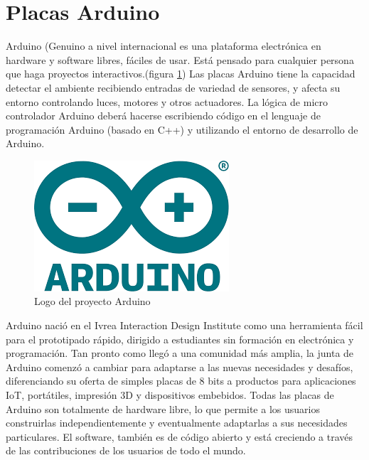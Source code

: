 \section{Placas Arduino}
Arduino (Genuino a nivel internacional es una plataforma electrónica en hardware y software libres, fáciles de usar. Está pensado para cualquier persona que haga proyectos interactivos.\cite{ArduinoOfficial}(figura \ref{fig:arduino_logo}) Las placas Arduino tiene la capacidad  detectar el ambiente recibiendo entradas de variedad de sensores, y afecta su entorno controlando luces, motores y otros actuadores. La lógica de micro controlador Arduino deberá hacerse escribiendo código en el lenguaje de programación Arduino (basado en C++) y utilizando el entorno de desarrollo de Arduino.\\

\begin{figure}[htb]
\centering
\includegraphics[scale=0.35]{./Figuras/arduino_logo.png}
\caption{Logo del proyecto Arduino}
\label{fig:arduino_logo}
\vspace*{-10pt}
\end{figure}

Arduino nació en el Ivrea Interaction Design Institute como una herramienta fácil para el prototipado rápido, dirigido a estudiantes sin formación en electrónica y programación. Tan pronto como llegó a una comunidad más amplia, la junta de Arduino comenzó a cambiar para adaptarse a las nuevas necesidades y desafíos, diferenciando su oferta de simples placas de 8 bits a productos para aplicaciones IoT, portátiles, impresión 3D y dispositivos embebidos. Todas las placas de Arduino son totalmente de hardware libre, lo que permite a los usuarios construirlas independientemente y eventualmente adaptarlas a sus necesidades particulares. El software, también es de código abierto y está creciendo a través de las contribuciones de los usuarios de todo el mundo.\\

